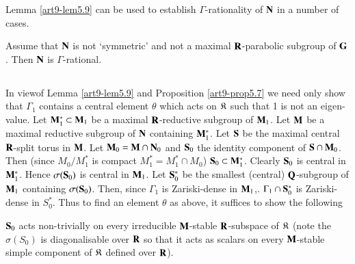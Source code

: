 Lemma \ref{art9-lem5.9} can be used to establish $\Gamma$-rationality of $\mathbf{N}$ in a number of cases.

\begin{proposition}\label{art9-prop5.10}
Assume that $\mathbf{N}$ is not `symmetric' and not a maximal $\mathbf{R}$-parabolic subgroup of $\mathbf{G}$. Then $\mathbf{N}$ is $\Gamma$-rational.
\end{proposition}

\setcounter{subsection}{10}
\subsection{}\label{art9-subsec5.11}
In view\pageoriginale of Lemma \ref{art9-lem5.9} and Proposition \ref{art9-prop5.7} we need only show that $\Gamma_1$ contains a central element $\theta$ which acts on $\mathfrak{K}$ such that 1 is not an eigen-value. Let $\mathbf{M}^\ast_1 \subset \mathbf{M}_1$ be a maximal $\mathbf{R}$-reductive subgroup of $\mathbf{M}_1$. Let $\mathbf{M}$ be a maximal reductive subgroup of $\mathbf{N}$ containing $\mathbf{M}^\ast_1$. Let $\mathbf{S}$ be the maximal central $\mathbf{R}$-split torus in $\mathbf{M}$. Let $\mathbf{M}_0 = \mathbf{M} \cap \mathbf{N}_0$ and $\mathbf{S}_0$ the identity component of $\mathbf{S} \cap \mathbf{M}_0$. Then (since $M_0/M^\ast_1$ is compact $M^\ast_1 = M^\ast_1 \cap M_0$) $\mathbf{S}_0 \subset \mathbf{M}^\ast_1$. Clearly $\mathbf{S}_0$ is central in $\mathbf{M}^\ast_1$. Hence $\sigma (\mathbf{S}_0)$ is central in $\mathbf{M}_1$. Let $\mathbf{S}^\ast_0$ be the smallest (central) $\mathbf{Q}$-subgroup of $\mathbf{M}_1$ containing $\sigma (\mathbf{S}_0)$.  Then, since $\Gamma_1$ is Zariski-dense in $\mathbf{M}_1$,. $\Gamma_1 \cap \mathbf{S}^\ast_0$ is Zariski-dense in $S^\ast_0$. Thus to find an element $\theta$ as above, it suffices to show the following

\setcounter{definition}{11}
\begin{claim}\label{art9-claim5.12}
$\mathbf{S}_0$ acts non-trivially on every irreducible $\mathbf{M}$-stable $\mathbf{R}$-subspace of $\mathfrak{K}$ (note the $\sigma (S_0)$ is diagonalisable over $\mathbf{R}$ so that it acts as scalars on every $\mathbf{M}$-stable simple component of $\mathfrak{K}$ defined over $\mathbf{R}$).
\end{claim}

\setcounter{subsection}{12}
